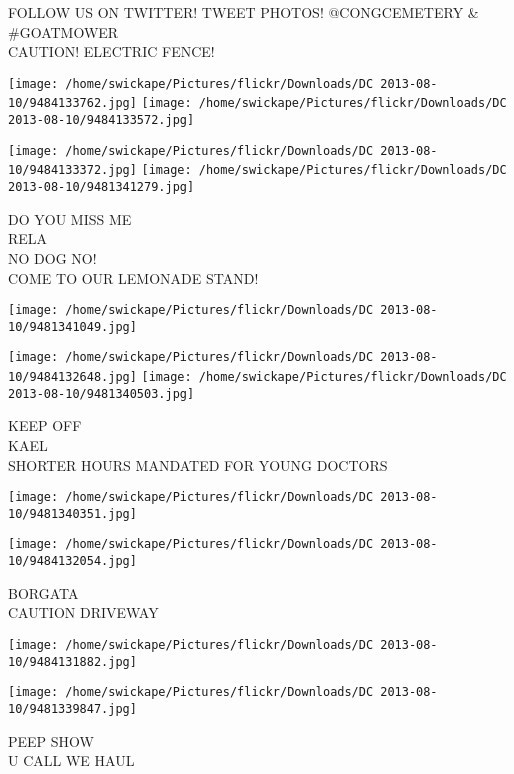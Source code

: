 \documentclass[10pt,letterpaper]{article}
\begin{document}
FOLLOW US ON TWITTER!  TWEET PHOTOS! @CONGCEMETERY \& \#GOATMOWER\\
CAUTION!  ELECTRIC FENCE!\\
\pagebreak

\texttt{[image: /home/swickape/Pictures/flickr/Downloads/DC 2013-08-10/9484133762.jpg]}
\texttt{[image: /home/swickape/Pictures/flickr/Downloads/DC 2013-08-10/9484133572.jpg]}

\texttt{[image: /home/swickape/Pictures/flickr/Downloads/DC 2013-08-10/9484133372.jpg]}
\texttt{[image: /home/swickape/Pictures/flickr/Downloads/DC 2013-08-10/9481341279.jpg]}

DO YOU MISS ME\\
RELA\\
NO DOG NO!\\
COME TO OUR LEMONADE STAND!\\
\pagebreak

\texttt{[image: /home/swickape/Pictures/flickr/Downloads/DC 2013-08-10/9481341049.jpg]}

\vspace{0.25in}
\texttt{[image: /home/swickape/Pictures/flickr/Downloads/DC 2013-08-10/9484132648.jpg]}
\texttt{[image: /home/swickape/Pictures/flickr/Downloads/DC 2013-08-10/9481340503.jpg]}

KEEP OFF\\
KAEL\\
SHORTER HOURS MANDATED FOR YOUNG DOCTORS\\
\pagebreak

\texttt{[image: /home/swickape/Pictures/flickr/Downloads/DC 2013-08-10/9481340351.jpg]}

\vspace{0.25in}
\texttt{[image: /home/swickape/Pictures/flickr/Downloads/DC 2013-08-10/9484132054.jpg]}

BORGATA\\
CAUTION DRIVEWAY\\
\pagebreak

\texttt{[image: /home/swickape/Pictures/flickr/Downloads/DC 2013-08-10/9484131882.jpg]}

\vspace{0.25in}
\texttt{[image: /home/swickape/Pictures/flickr/Downloads/DC 2013-08-10/9481339847.jpg]}

PEEP SHOW\\
U CALL WE HAUL\\
\pagebreak
\end{document}

